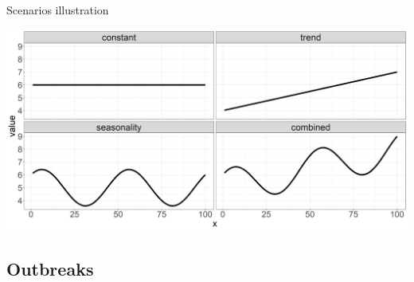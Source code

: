 \documentclass[aspectratio=169]{beamer}
\begin{document}
\begin{frame}{Scenarios illustration}
\tiny

\includegraphics[width=1\linewidth]{../figures/scenarioIllustration}

\normalsize
\end{frame}

\hypertarget{outbreaks}{%
\subsection{Outbreaks}\label{outbreaks}}
\end{document}

